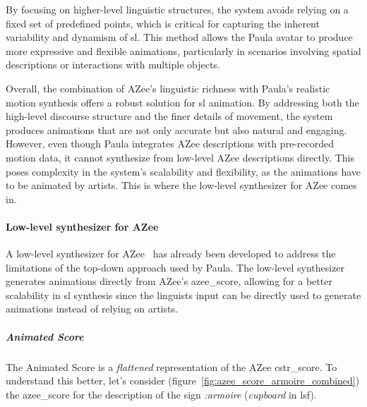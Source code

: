 \documentclass[../../main.tex]{subfiles}
\begin{document}
By focusing on higher-level linguistic structures, the system avoids relying on a fixed set of predefined points, which is critical for capturing the inherent variability and dynamism of \gls{sl}. This method allows the Paula avatar to produce more expressive and flexible animations, particularly in scenarios involving spatial descriptions or interactions with multiple objects.

Overall, the combination of AZee’s linguistic richness with Paula’s realistic motion synthesis offers a robust solution for \gls{sl} animation. By addressing both the high-level discourse structure and the finer details of movement, the system produces animations that are not only accurate but also natural and engaging. However, even though Paula integrates AZee descriptions with pre-recorded motion data, it cannot synthesize from low-level AZee descriptions directly. This poses complexity in the system's scalability and flexibility, as the animations have to be animated by artists. This is where the low-level synthesizer for AZee comes in.

\paragraph{Low-level synthesizer for AZee}
\label{ch:background_work:sign_language_synthesis:3d_techniques:sign_language_synthesis_systems:azee_based:low_level_synthesizer_for_azee}

A low-level synthesizer for AZee~\cite{nunnari2018animating} has already been developed to address the limitations of the top-down approach used by Paula. The low-level synthesizer generates animations directly from AZee's \gls{azee_score}, allowing for a better scalability in \gls{sl} synthesis since the linguists input can be directly used to generate animations instead of relying on artists.

\subparagraph{Animated Score}
\label{ch:background_work:sign_language_synthesis:3d_techniques:sign_language_synthesis_systems:azee_based:low_level_synthesizer_for_azee:animated_score}

The Animated Score is a \emph{flattened} representation of the AZee \gls{cstr_score}. To understand this better, let's consider (figure~\ref{fig:azee_score_armoire_combined}) the \gls{azee_score} for the description of the sign \emph{:armoire} (\emph{cupboard} in \gls{lsf}).
\end{document}
